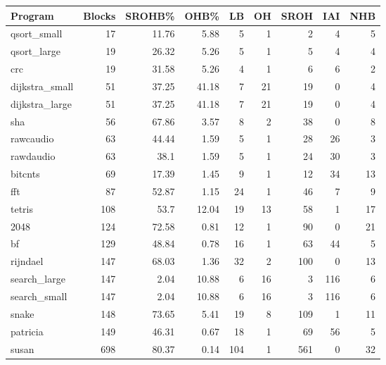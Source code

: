 \begin{tabular}{lrrrrrrrr}
\hline
 Program        &   Blocks &   SROHB\% &   OHB\% &   LB &   OH &   SROH &   IAI &   NHB \\
\hline
 qsort\_small    &       17 &    11.76 &   5.88 &    5 &    1 &      2 &     4 &     5 \\
 qsort\_large    &       19 &    26.32 &   5.26 &    5 &    1 &      5 &     4 &     4 \\
 crc            &       19 &    31.58 &   5.26 &    4 &    1 &      6 &     6 &     2 \\
 dijkstra\_small &       51 &    37.25 &  41.18 &    7 &   21 &     19 &     0 &     4 \\
 dijkstra\_large &       51 &    37.25 &  41.18 &    7 &   21 &     19 &     0 &     4 \\
 sha            &       56 &    67.86 &   3.57 &    8 &    2 &     38 &     0 &     8 \\
 rawcaudio      &       63 &    44.44 &   1.59 &    5 &    1 &     28 &    26 &     3 \\
 rawdaudio      &       63 &    38.1  &   1.59 &    5 &    1 &     24 &    30 &     3 \\
 bitcnts        &       69 &    17.39 &   1.45 &    9 &    1 &     12 &    34 &    13 \\
 fft            &       87 &    52.87 &   1.15 &   24 &    1 &     46 &     7 &     9 \\
 tetris         &      108 &    53.7  &  12.04 &   19 &   13 &     58 &     1 &    17 \\
 2048           &      124 &    72.58 &   0.81 &   12 &    1 &     90 &     0 &    21 \\
 bf             &      129 &    48.84 &   0.78 &   16 &    1 &     63 &    44 &     5 \\
 rijndael       &      147 &    68.03 &   1.36 &   32 &    2 &    100 &     0 &    13 \\
 search\_large   &      147 &     2.04 &  10.88 &    6 &   16 &      3 &   116 &     6 \\
 search\_small   &      147 &     2.04 &  10.88 &    6 &   16 &      3 &   116 &     6 \\
 snake          &      148 &    73.65 &   5.41 &   19 &    8 &    109 &     1 &    11 \\
 patricia       &      149 &    46.31 &   0.67 &   18 &    1 &     69 &    56 &     5 \\
 susan          &      698 &    80.37 &   0.14 &  104 &    1 &    561 &     0 &    32 \\

\end{tabular}
